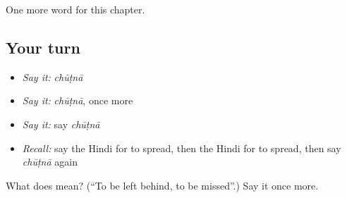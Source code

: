 \begin{grammarlens}[title={What you've built}]
One more word for this chapter.
\end{grammarlens}

\subsection*{Your turn}
\begin{itemize}
\raggedright
  \item \emph{Say it:} \emph{chūṭnā}
  \item \emph{Say it:} \emph{chūṭnā}, once more
  \item \emph{Say it:} say \emph{chūṭnā}
  \item \emph{Recall:} say the Hindi for to spread, then the Hindi for to spread, then say \emph{chūṭnā} again
\end{itemize}

\begin{tcolorbox}[breakable,colback=teal!4,colframe=teal!35!black,title={Before you move on}]
What does  mean? (\textquotedblleft{}To be left behind, to be missed\textquotedblright{}.) Say it once more.
\end{tcolorbox}
